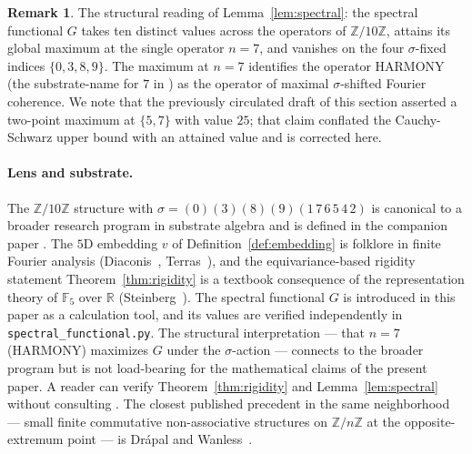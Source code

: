 \documentclass[11pt,reqno]{amsart}
\theoremstyle{definition}
\newtheorem{remark}[theorem]{Remark}
\newcommand{\Z}{\mathbb{Z}}
\newcommand{\R}{\mathbb{R}}
\newcommand{\F}{\mathbb{F}}
\begin{document}
\begin{remark}
\label{rem:G-structural}
The structural reading of Lemma~\ref{lem:spectral}: the spectral
functional $G$ takes ten distinct values across the operators of
$\Z/10\Z$, attains its global maximum at the single operator
$n = 7$, and vanishes on the four $\sigma$-fixed indices
$\{0, 3, 8, 9\}$. The maximum at $n = 7$ identifies the operator
HARMONY (the substrate-name for $7$ in
\cite{SandersGishFourCore}) as the operator of maximal
$\sigma$-shifted Fourier coherence. We note that the previously
circulated draft of this section asserted a two-point maximum at
$\{5, 7\}$ with value $25$; that claim conflated the
Cauchy-Schwarz upper bound with an attained value and is
corrected here.
\end{remark}

\paragraph{Lens and substrate.}
The $\Z/10\Z$ structure with
$\sigma = (0)(3)(8)(9)(1\,7\,6\,5\,4\,2)$ is canonical to a
broader research program in substrate algebra and is defined in
the companion paper \cite{SandersGishFourCore}. The $5$D
embedding $v$ of Definition~\ref{def:embedding} is folklore in
finite Fourier analysis (Diaconis~\cite{Diaconis1988},
Terras~\cite{Terras1999}), and the equivariance-based rigidity
statement Theorem~\ref{thm:rigidity} is a textbook consequence
of the representation theory of $\F_5$ over $\R$
(Steinberg~\cite{Steinberg2012}). The spectral functional
$G$ is introduced in this paper as a calculation tool, and its
values are verified independently in
\texttt{spectral\_functional.py}. The structural interpretation
--- that $n = 7$ (HARMONY) maximizes $G$ under the $\sigma$-action
--- connects to the broader program but is not load-bearing for
the mathematical claims of the present paper. A reader can verify
Theorem~\ref{thm:rigidity} and Lemma~\ref{lem:spectral} without
consulting \cite{SandersGishFourCore}. The closest published
precedent in the same neighborhood --- small finite commutative
non-associative structures on $\Z/n\Z$ at the opposite-extremum
point --- is Drápal and Wanless~\cite{DrapalWanless2021}.
\end{document}
